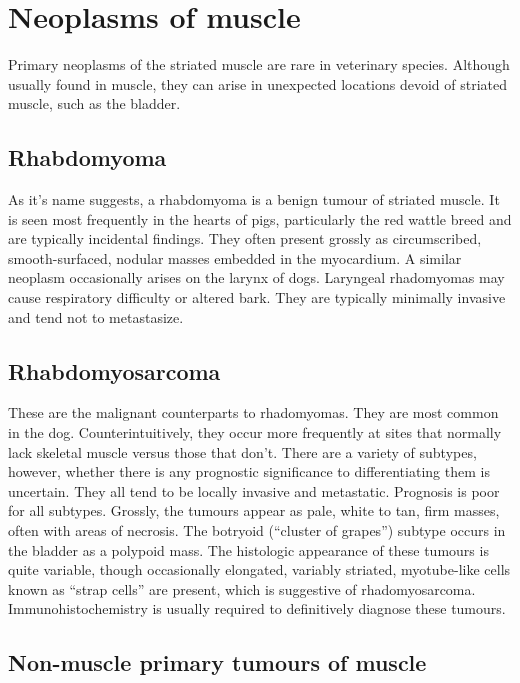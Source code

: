 \documentclass[openany]{book}
\begin{document}
\chapter{Neoplasms of muscle}\label{neoplasms-of-muscle}

Primary neoplasms of the striated muscle are rare in veterinary species.
Although usually found in muscle, they can arise in unexpected locations
devoid of striated muscle, such as the bladder.

\section{Rhabdomyoma}\label{rhabdomyoma}

As it's name suggests, a rhabdomyoma is a benign tumour of striated
muscle. It is seen most frequently in the hearts of pigs, particularly
the red wattle breed and are typically incidental findings. They often
present grossly as circumscribed, smooth-surfaced, nodular masses
embedded in the myocardium. A similar neoplasm occasionally arises on
the larynx of dogs. Laryngeal rhadomyomas may cause respiratory
difficulty or altered bark. They are typically minimally invasive and
tend not to metastasize.

\section{Rhabdomyosarcoma}\label{rhabdomyosarcoma}

These are the malignant counterparts to rhadomyomas. They are most
common in the dog. Counterintuitively, they occur more frequently at
sites that normally lack skeletal muscle versus those that don't. There
are a variety of subtypes, however, whether there is any prognostic
significance to differentiating them is uncertain. They all tend to be
locally invasive and metastatic. Prognosis is poor for all subtypes.
Grossly, the tumours appear as pale, white to tan, firm masses, often
with areas of necrosis. The botryoid (``cluster of grapes'') subtype
occurs in the bladder as a polypoid mass. The histologic appearance of
these tumours is quite variable, though occasionally elongated, variably
striated, myotube-like cells known as ``strap cells'' are present, which
is suggestive of rhadomyosarcoma. Immunohistochemistry is usually
required to definitively diagnose these tumours.

\section{Non-muscle primary tumours of
muscle}\label{non-muscle-primary-tumours-of-muscle}
\end{document}

